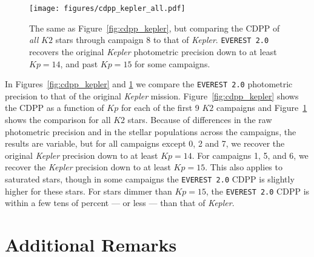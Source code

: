 \documentclass[]{emulateapj}
\newcommand{\Kp}{\ensuremath{Kp}}
\newcommand{\edited}[1]{{\color{red} #1}}
\begin{document}
\begin{figure}[hbt]
  \begin{center}
      \texttt{[image: figures/cdpp\_kepler\_all.pdf]}
       \caption{The same as Figure~\ref{fig:cdpp_kepler}, but comparing the CDPP of \emph{all} $K2$ stars
                \edited{through campaign 8} to that of \emph{Kepler}. \texttt{EVEREST 2.0} recovers the original \emph{Kepler}
                photometric precision down to at least $\Kp = 14$, and past $\Kp = 15$ for some
                campaigns.}
     \label{fig:cdpp_kepler_all}
  \end{center}
\end{figure}

In Figures~\ref{fig:cdpp_kepler} and \ref{fig:cdpp_kepler_all} we compare the \texttt{EVEREST 2.0}
photometric precision to that of the original \emph{Kepler} mission. Figure~\ref{fig:cdpp_kepler}
shows the CDPP as a function of $\Kp$ for each of the first 9 $K2$ campaigns and
Figure~\ref{fig:cdpp_kepler_all} shows the comparison for all $K2$ stars. Because of differences
in the raw photometric precision and in the stellar populations across the campaigns, the
results are variable, but for all campaigns except 0, 2 and 7, we recover the original \emph{Kepler}
precision down to at least $\Kp = 14$. For campaigns 1, 5, and 6, we recover the \emph{Kepler}
precision down to at least $\Kp = 15$. This also applies to saturated stars, though in some
campaigns the \texttt{EVEREST 2.0} CDPP is slightly higher for these stars. For stars
dimmer than $\Kp = 15$, the \texttt{EVEREST 2.0} CDPP is within a few tens of percent ---
or less --- than that of \emph{Kepler}.

\section{Additional Remarks}
\label{sec:remarks}
\end{document}
